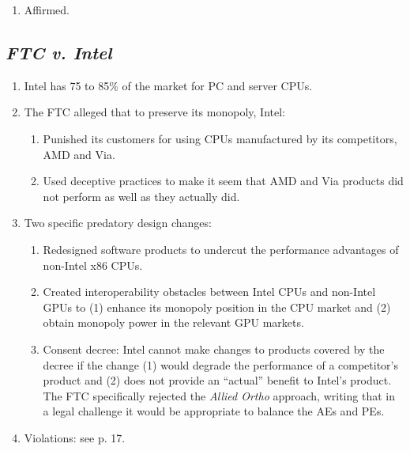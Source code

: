 \begin{enumerate}
\begin{enumerate}
{        a monopolist and harms competitors as a 
        result}.''\footnote{999--1000.} Coercive conduct is required.
        \item There is no room for balancing the benefits of the product 
        improvements against its anticompetitive effects. Innovation is 
        \textbf{per se legal} (at least in the Ninth Circuit).
        \item ``~.~.~.~Plaintiffs have provided no evidence that Tyco used its 
        monopoly power to force consumers of pulse oximetry products to adopts 
        its new OxiMax technology. Absent evidence of such compulsion, the 
        only rational inference that can be drawn from some consumers' 
        adoption of OxiMax is that they regarded it to be a superior 
        product.''\footnote{1002.}
        \item No \S\ 2 violation.
    \end{enumerate}
    \item Affirmed.
\end{enumerate}

\subsection{\emph{FTC v. Intel}}
\label{sub:intel}

\begin{enumerate}
    \item Intel has 75 to 85\% of the market for PC and server CPUs.
    \item The FTC alleged that to preserve its monopoly, Intel:
    \begin{enumerate}
        \item Punished its customers for using CPUs manufactured by its 
        competitors, AMD and Via.
        \item Used deceptive practices to make it seem that AMD and Via 
        products did not perform as well as they actually did.
    \end{enumerate}
    \item Two specific predatory design changes:
    \begin{enumerate}
        \item Redesigned software products to undercut the performance 
        advantages of non-Intel x86 CPUs.
        \item Created interoperability obstacles between Intel CPUs and 
        non-Intel GPUs to (1) enhance its monopoly position in the CPU market 
        and (2) obtain monopoly power in the relevant GPU markets.
        \item Consent decree: Intel cannot make changes to products covered by 
        the decree if the change (1) would degrade the performance of a 
        competitor's product and (2) does not provide an ``actual'' benefit to 
        Intel's product. The FTC specifically rejected the \emph{Allied Ortho} 
        approach, writing that in a legal challenge it would be appropriate to 
        balance the AEs and PEs.
    \end{enumerate}
    \item Violations: see p. 17.
\end{enumerate}
